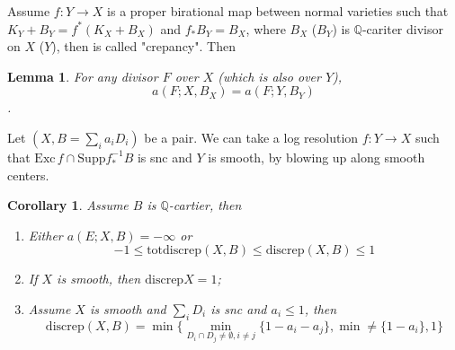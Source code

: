 \documentclass{article}
\newtheorem{lem}[defn]{Lemma}
\newtheorem{cor}[defn]{Corollary}
\begin{document}
Assume $ f:Y\to X $ is a proper birational map between normal varieties such that $ K_Y+B_Y=f^*(K_X+B_X) $ and $ f_*B_Y=B_X $, where $ B_X $ ($ B_Y $) is $ \mathbb{Q} $-cariter divisor on $ X $ ($ Y $), then is called "crepancy". Then
\begin{lem}
	For any divisor $ F $ over $ X $ (which is also over $ Y $), 
	$$ a(F;X,B_X)=a(F;Y,B_Y) $$. 
\end{lem}

Let $ (X,B=\sum_ia_iD_i) $ be  a pair. We can take a log resolution $ f:Y\to X $ such that $ \mathrm{Exc}\,f\cap \mathrm{Supp}f^{-1}_*B $ is snc and $ Y $ is smooth, by blowing up along smooth centers.

\begin{cor}
	Assume $ B $ is $ \mathbb{Q} $-cartier, then
	\begin{enumerate}[(1)]
		\item Either $ a(E;X,B)=-\infty $ or 
		$$ -1\leqslant \mathrm{totdiscrep}(X,B)\leqslant \mathrm{discrep }(X,B)\leqslant 1 $$
		\item If $ X $ is smooth, then $ \mathrm{discrep}X=1 $;
		\item Assume $ X $ is smooth and $ \sum_i D_i $ is snc and $ a_i\leqslant 1 $, then
		$$ \mathrm{discrep}(X,B)=\min \{  \min_{D_i\cap D_j\neq \emptyset,i\neq j}\{1-a_i-a_j\}, \min\neq \{1-a_i\},1\} $$ 
	\end{enumerate}
\end{cor} 
\end{document}
